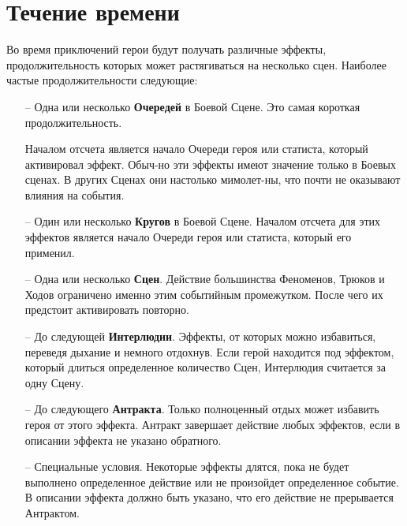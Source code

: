 \section{Течение времени}
Во время приключений герои будут получать различные эффекты, продолжительность которых может растягиваться на несколько сцен. Наиболее частые продолжительности следующие:
\begin{itemize}
\item[--] Одна или несколько \textbf{Очередей} в Боевой Сцене. Это самая короткая продолжительность.
\begin{tcolorbox}
Началом отсчета является начало Очереди героя или статиста, который активировал эффект. Обыч-но эти эффекты имеют значение только в Боевых сценах. В других Сценах они настолько мимолет-ны, что почти не оказывают влияния на события.
\end{tcolorbox}
\item[--] Один или несколько \textbf{Кругов} в Боевой Сцене. Началом отсчета для этих эффектов является начало Очереди героя или статиста, который его применил.
\item[--] Одна или несколько \textbf{Сцен}. Действие большинства Феноменов, Трюков и Ходов ограничено именно этим событийным промежутком. После чего их предстоит активировать повторно.
\item[--] До следующей \textbf{Интерлюдии}. Эффекты, от которых можно избавиться, переведя дыхание и немного отдохнув. Если герой находится под эффектом, который длиться определенное количество Сцен, Интерлюдия считается за одну Сцену.
\item[--] До следующего \textbf{Антракта}. Только полноценный отдых может избавить героя от этого эффекта. Антракт завершает действие любых эффектов, если в описании эффекта не указано обратного.
\item[--] Специальные условия. Некоторые эффекты длятся, пока не будет выполнено определенное действие или не произойдет определенное событие. В описании эффекта должно быть указано, что его действие не прерывается Антрактом.
\end{itemize}
